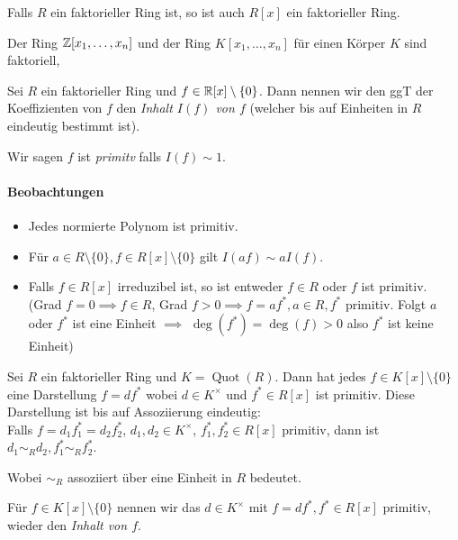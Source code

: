 \begin{theorem}[Gauss]
	Falls $R$ ein faktorieller Ring ist, so ist auch $R[x]$ ein faktorieller Ring.
\end{theorem}

\begin{corollary}
	Der Ring $\mathbb{Z}[x_1,\ldots,x_{n}]$ und der Ring $K[x_1,\ldots,x_{n}]$ für einen Körper $K$ sind faktoriell,
\end{corollary}

\begin{definition}
	Sei $R$ ein faktorieller Ring und $f \in \mathbb{R}[x] \setminus \{0\}$.
	Dann nennen wir den ggT der Koeffizienten von $f$ den \emph{Inhalt $I(f)$ von $f$ }
	(welcher bis auf Einheiten in $R$ eindeutig bestimmt ist).

	Wir sagen $f$ ist \emph{primitv} falls $I(f) \sim 1$.
\end{definition}


\paragraph{Beobachtungen}
\begin{itemize}
	\item Jedes normierte Polynom ist primitiv.
	\item Für $a \in R \setminus \{0\}, f \in R[x] \setminus \{0\} $ gilt $I(af) \sim a I(f)$.
	\item Falls  $f \in R[x]$ irreduzibel ist, so ist entweder
		$f \in R$ oder $f$ ist primitiv.
		(Grad $f = 0 \implies f \in R$, Grad $f > 0 \implies f = a f^{*}, a \in R, f^{*}$ primitiv.
		Folgt $a$ oder $f^{*}$ ist eine Einheit $\implies$ $\deg(f^{*}) = \deg(f) > 0$ also $f^{*}$ ist keine Einheit)
\end{itemize}

\begin{lemma}
	Sei $R$ ein faktorieller Ring und $K = \operatorname{Quot}(R)$.
	Dann hat jedes  $f \in K[x] \setminus \{0\} $ eine Darstellung $f = d f^{*}$ 
	wobei $d \in K^{\times}$ und $f^{*} \in R[x]$ ist primitiv.
	Diese Darstellung ist bis auf Assoziierung eindeutig:\\
	Falls $f = d_1 f_1^{*} = d_2 f_2^{*}$, $d_1,d_2 \in K^{\times}$,
	$f_1^{*},f_2^{*} \in R[x]$ primitiv, dann ist $d_1 \sim_{R} d_2, f_1^{*} \sim_{R} f_2^{*}$.
	
	Wobei $\sim_{R}$  assoziiert über eine Einheit in $R$ bedeutet.
\end{lemma}


\begin{definition}
	Für $f \in K[x] \setminus \{0\} $ nennen wir das $d \in K^{\times}$ mit $f = d f^{*}, f^{*} \in R[x]$ primitiv, wieder den \emph{Inhalt von $f$}.
\end{definition}

